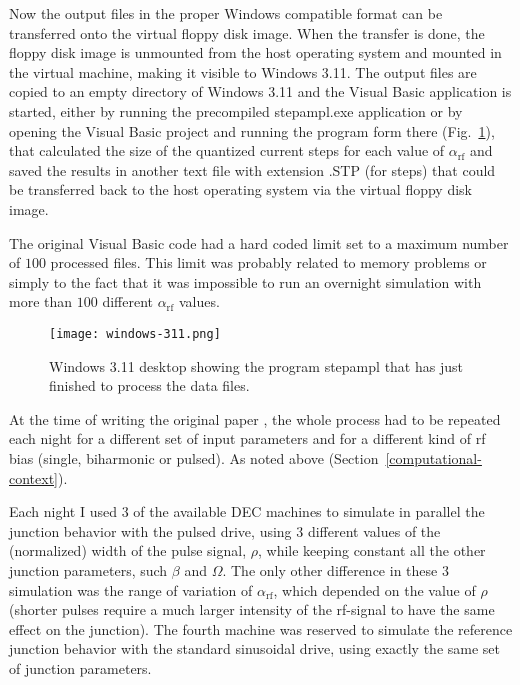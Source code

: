Now the output files in the proper Windows compatible format can be transferred onto the virtual floppy disk image. %
When the transfer is done, the floppy disk image is unmounted from the host operating system and mounted  in the virtual machine, making it visible to Windows 3.11. 
The output files are copied to an empty directory of Windows 3.11 and the Visual Basic application is started, either by running the precompiled \textsf{stepampl.exe} application or by opening the Visual Basic project and running the program form there (Fig.~\ref{fig:stepampl}), that calculated the size of the quantized current steps for each value of $\alpha_\mathrm{rf}$ and saved the results in another text file with extension \textsf{.STP} (for steps) that could be transferred back to the host operating system via the virtual floppy disk image.

The original Visual Basic code had a hard coded limit set to a maximum number of $100$ processed files. This limit was probably related to memory problems or simply to the fact that it was impossible to run an overnight simulation with more than $100$ different $\alpha_\mathrm{rf}$ values.

\begin{figure}[tbh]
	\centering
	\texttt{[image: windows-311.png]}
	\caption{Windows 3.11 desktop showing the program \textsf{stepampl} that has just finished to process the data files.}
	\label{fig:stepampl}
\end{figure}


At the time of writing the original paper \cite{Maggi:1996}, the whole process had to be repeated each night for a different set of input parameters  and for a different kind of rf bias (single, biharmonic or pulsed). As noted above (Section~\ref{computational-context}). 

Each night I used $3$ of the available DEC machines to simulate in parallel the junction behavior with the pulsed drive, using $3$ different values of the (normalized) width of the pulse signal, $\rho$, while keeping constant all the other junction parameters, such $\beta$ and $\Omega$.
The only other difference in these $3$ simulation was the range of variation of $\alpha_\mathrm{rf}$, which depended on the value of $\rho$ (shorter pulses require a much larger intensity of the rf-signal to have the same effect on the junction).
The fourth machine was reserved to simulate the reference junction behavior with the standard sinusoidal drive, using exactly the same set of junction parameters.

